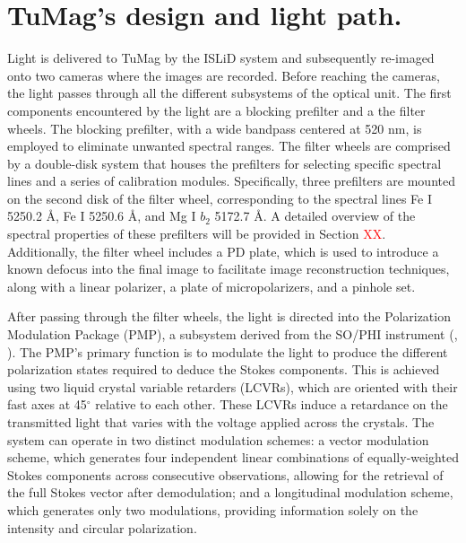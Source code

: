 \section{TuMag's design and light path.}

Light is delivered to TuMag by the ISLiD system and subsequently re-imaged onto two cameras where the images are recorded. Before reaching the cameras, the light passes through all the different subsystems of the optical unit. The first components encountered by the light are a blocking prefilter and a the filter wheels. The blocking prefilter, with a wide bandpass centered at 520 nm, is employed to eliminate unwanted spectral ranges. The filter wheels  are comprised by a double-disk system \citep{filter-wheels} that houses the prefilters for selecting specific spectral lines and a series of calibration modules. Specifically, three prefilters are mounted on the second disk of the filter wheel, corresponding to the spectral lines Fe I 5250.2 \r{A}, Fe I 5250.6 \r{A}, and Mg I $b_2$ 5172.7 \r{A}. A detailed overview of the spectral properties of these prefilters will be provided in Section \textcolor{red}{XX}. Additionally, the filter wheel includes a PD plate, which is used to introduce a known defocus into the final image to facilitate image reconstruction techniques, along with a linear polarizer, a plate of micropolarizers, and a pinhole set.

After passing through the filter wheels, the light is directed into the Polarization Modulation Package (PMP), a subsystem derived from the SO/PHI instrument (\citealt{pmp1}, \citealt{PHI}). The PMP's primary function is to modulate the light to produce the different polarization states required to deduce the Stokes components. This is achieved using two liquid crystal variable retarders (LCVRs), which are oriented with their fast axes at 45$^\circ$ relative to each other. These LCVRs induce a retardance on the transmitted light that varies with the voltage applied across the crystals. The system can operate in two distinct modulation schemes: a vector modulation scheme, which generates four independent linear combinations of equally-weighted Stokes components across consecutive observations, allowing for the retrieval of the full Stokes vector after demodulation; and a longitudinal modulation scheme, which generates only two modulations, providing information solely on the intensity and circular polarization.

